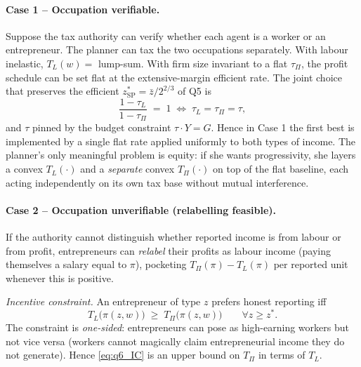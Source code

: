 \documentclass[11pt,a4paper]{article}
\begin{document}
\paragraph{Case 1 -- Occupation verifiable.}
Suppose the tax authority can verify whether each agent is a worker or an entrepreneur. The planner can tax the two occupations separately. With labour inelastic, $T_{L}(w)=$ lump-sum. With firm size invariant to a flat $\tau_{\Pi}$, the profit schedule can be set flat at the extensive-margin efficient rate. The joint choice that preserves the efficient $z^{*}_{\text{SP}}=\bar z/2^{2/3}$ of Q5 is
\[
\frac{1-\tau_{L}}{1-\tau_{\Pi}}\;=\;1\;\Longleftrightarrow\;\tau_{L}=\tau_{\Pi}=\tau,
\]
and $\tau$ pinned by the budget constraint $\tau\cdot Y=G$. Hence in Case 1 the first best is implemented by a single flat rate applied uniformly to both types of income. The planner's only meaningful problem is equity: if she wants progressivity, she layers a convex $T_{L}(\cdot)$ and a \emph{separate} convex $T_{\Pi}(\cdot)$ on top of the flat baseline, each acting independently on its own tax base without mutual interference.

\paragraph{Case 2 -- Occupation unverifiable (relabelling feasible).}
If the authority cannot distinguish whether reported income is from labour or from profit, entrepreneurs can \emph{relabel} their profits as labour income (paying themselves a salary equal to $\pi$), pocketing $T_{\Pi}(\pi)-T_{L}(\pi)$ per reported unit whenever this is positive.

\smallskip
\emph{Incentive constraint.} An entrepreneur of type $z$ prefers honest reporting iff
\begin{equation}
T_{L}\bigl(\pi(z,w)\bigr)\;\ge\; T_{\Pi}\bigl(\pi(z,w)\bigr)\qquad \forall z\ge z^{*}.
\label{eq:q6_IC}
\end{equation}
The constraint is \emph{one-sided}: entrepreneurs can pose as high-earning workers but not vice versa (workers cannot magically claim entrepreneurial income they do not generate). Hence \eqref{eq:q6_IC} is an upper bound on $T_{\Pi}$ in terms of $T_{L}$.
\end{document}
